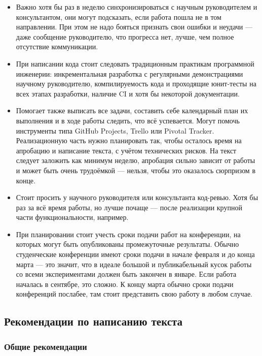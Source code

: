 \documentclass{article}
\begin{document}
\begin{itemize}
    \item Важно хотя бы раз в неделю синхронизироваться с научным руководителем и консультантом, они могут подсказать, если работа пошла не в том направлении. При этом не надо бояться признать свои ошибки и неудачи --- даже сообщение руководителю, что прогресса нет, лучше, чем полное отсутствие коммуникации.
    \item При написании кода стоит следовать традиционным практикам программной инженерии: инкрементальная разработка с регулярными демонстрациями научному руководителю, компилируемость кода и проходящие юнит-тесты на всех этапах разработки, наличие CI и хотя бы некоторой документации. 
    \item Помогает также выписать все задачи, составить себе календарный план их выполнения и в ходе работы следить, что всё успевается. Могут помочь инструменты типа GitHub Projects, Trello или Pivotal Tracker. Реализационную часть нужно планировать так, чтобы осталось время на апробацию и написание текста, с учётом технических рисков. На текст следует заложить как минимум неделю, апробация сильно зависит от работы и может быть очень трудоёмкой --- нельзя, чтобы это оказалось сюрпризом в конце.
    \item Стоит просить у научного руководителя или консультанта код-ревью. Хотя бы раз за всё время работы, но лучше почаще --- после реализации крупной части функциональности, например.
    \item При планировании стоит учесть сроки подачи работ на конференции, на которых могут быть опубликованы промежуточные результаты. Обычно студенческие конференции имеют сроки подачи в начале февраля и до конца марта --- это значит, что в идеале большой и публикабельный кусок работы со всеми экспериментами должен быть закончен в январе. Если работа началась в сентябре, это сложно. К концу марта обычно сроки подачи конференций послабее, там стоит представить свою работу в любом случае.
\end{itemize}

\subsection{Рекомендации по написанию текста}

\subsubsection{Общие рекомендации}
\end{document}
